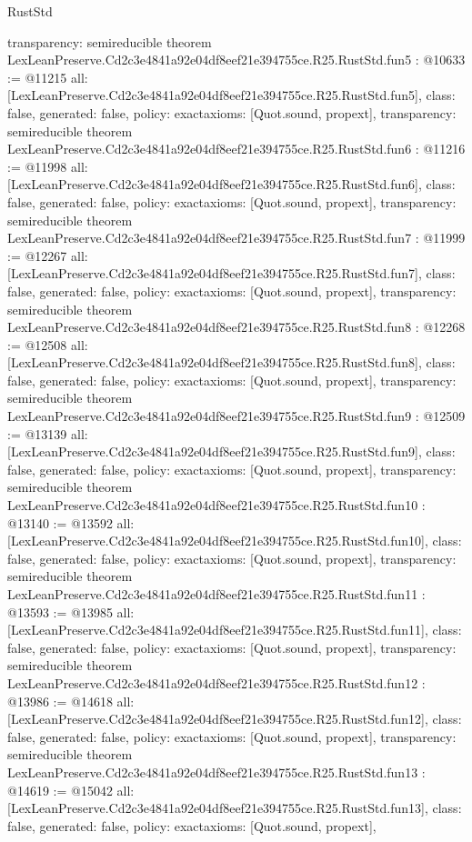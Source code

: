 \begin{lexlean}{RustStd}
\begin{coremodule}
{  transparency: semireducible
}
theorem LexLeanPreserve.Cd2c3e4841a92e04df8eef21e394755ce.R25.RustStd.fun5 : @10633 := @11215 {
  all: [LexLeanPreserve.Cd2c3e4841a92e04df8eef21e394755ce.R25.RustStd.fun5],
  class: false,
  generated: false,
  policy: exact{axioms: [Quot.sound, propext]},
  transparency: semireducible
}
theorem LexLeanPreserve.Cd2c3e4841a92e04df8eef21e394755ce.R25.RustStd.fun6 : @11216 := @11998 {
  all: [LexLeanPreserve.Cd2c3e4841a92e04df8eef21e394755ce.R25.RustStd.fun6],
  class: false,
  generated: false,
  policy: exact{axioms: [Quot.sound, propext]},
  transparency: semireducible
}
theorem LexLeanPreserve.Cd2c3e4841a92e04df8eef21e394755ce.R25.RustStd.fun7 : @11999 := @12267 {
  all: [LexLeanPreserve.Cd2c3e4841a92e04df8eef21e394755ce.R25.RustStd.fun7],
  class: false,
  generated: false,
  policy: exact{axioms: [Quot.sound, propext]},
  transparency: semireducible
}
theorem LexLeanPreserve.Cd2c3e4841a92e04df8eef21e394755ce.R25.RustStd.fun8 : @12268 := @12508 {
  all: [LexLeanPreserve.Cd2c3e4841a92e04df8eef21e394755ce.R25.RustStd.fun8],
  class: false,
  generated: false,
  policy: exact{axioms: [Quot.sound, propext]},
  transparency: semireducible
}
theorem LexLeanPreserve.Cd2c3e4841a92e04df8eef21e394755ce.R25.RustStd.fun9 : @12509 := @13139 {
  all: [LexLeanPreserve.Cd2c3e4841a92e04df8eef21e394755ce.R25.RustStd.fun9],
  class: false,
  generated: false,
  policy: exact{axioms: [Quot.sound, propext]},
  transparency: semireducible
}
theorem LexLeanPreserve.Cd2c3e4841a92e04df8eef21e394755ce.R25.RustStd.fun10 : @13140 := @13592 {
  all: [LexLeanPreserve.Cd2c3e4841a92e04df8eef21e394755ce.R25.RustStd.fun10],
  class: false,
  generated: false,
  policy: exact{axioms: [Quot.sound, propext]},
  transparency: semireducible
}
theorem LexLeanPreserve.Cd2c3e4841a92e04df8eef21e394755ce.R25.RustStd.fun11 : @13593 := @13985 {
  all: [LexLeanPreserve.Cd2c3e4841a92e04df8eef21e394755ce.R25.RustStd.fun11],
  class: false,
  generated: false,
  policy: exact{axioms: [Quot.sound, propext]},
  transparency: semireducible
}
theorem LexLeanPreserve.Cd2c3e4841a92e04df8eef21e394755ce.R25.RustStd.fun12 : @13986 := @14618 {
  all: [LexLeanPreserve.Cd2c3e4841a92e04df8eef21e394755ce.R25.RustStd.fun12],
  class: false,
  generated: false,
  policy: exact{axioms: [Quot.sound, propext]},
  transparency: semireducible
}
theorem LexLeanPreserve.Cd2c3e4841a92e04df8eef21e394755ce.R25.RustStd.fun13 : @14619 := @15042 {
  all: [LexLeanPreserve.Cd2c3e4841a92e04df8eef21e394755ce.R25.RustStd.fun13],
  class: false,
  generated: false,
  policy: exact{axioms: [Quot.sound, propext]},
}
\end{coremodule}
\end{lexlean}
